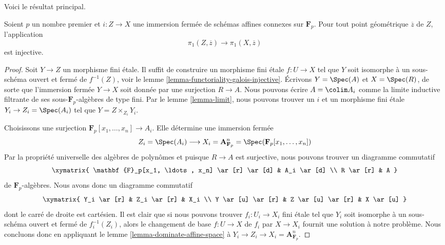 \noindent
Voici le résultat principal.

\begin{proposition}
\label{proposition-injective}
Soient $p$ un nombre premier et $i : Z \to X$ une immersion fermée
de schémas affines connexes sur $\mathbf{F}_p$. Pour tout point géométrique
$\overline{z}$ de $Z$, l'application
$$
\pi_1(Z, \overline{z}) \to \pi_1(X, \overline{z})
$$
est injective.
\end{proposition}

\begin{proof}
Soit $Y \to Z$ un morphisme fini \'etale. Il suffit de construire
un morphisme fini \'etale $f : U \to X$ tel que $Y$ soit isomorphe à
un sous-schéma ouvert et fermé de $f^{-1}(Z)$, voir
le lemme \ref{lemma-functoriality-galois-injective}.
Écrivons $Y = \Spec(A)$ et $X = \Spec(R)$, de sorte que l'immersion fermée
$Y \to X$ soit donnée par une surjection $R \to A$. Nous pouvons écrire
$A = \colim A_i$ comme la limite inductive filtrante de ses sous-$\mathbf{F}_p$-algèbres
de type fini. Par le lemme \ref{lemma-limit},
nous pouvons trouver un $i$ et un morphisme fini \'etale $Y_i \to Z_i = \Spec(A_i)$
tel que $Y = Z \times_{Z_i} Y_i$.

\medskip\noindent
Choisissons une surjection $\mathbf{F}_p[x_1, \ldots, x_n] \to A_i$.
Elle détermine une immersion fermée
$$
Z_i = \Spec(A_i)
\longrightarrow
X_i = \mathbf{A}^n_{\mathbf{F}_p} = \Spec(\mathbf{F}_p[x_1, \ldots, x_n])
$$
Par la propriété universelle des algèbres de polynômes et puisque
$R \to A$ est surjective, nous pouvons trouver un diagramme commutatif
$$
\xymatrix{
\mathbf{F}_p[x_1, \ldots, x_n] \ar[r] \ar[d] &
A_i \ar[d] \\
R \ar[r] &
A
}
$$
de $\mathbf{F}_p$-algèbres. Nous avons donc un diagramme commutatif
$$
\xymatrix{
Y_i \ar[r] &
Z_i \ar[r] &
X_i \\
Y \ar[u] \ar[r] &
Z \ar[u] \ar[r] &
X \ar[u]
}
$$
dont le carré de droite est cartésien. Il est clair que si nous pouvons
trouver $f_i : U_i \to X_i$ fini \'etale tel que $Y_i$ soit
isomorphe à un sous-schéma ouvert et fermé de $f_i^{-1}(Z_i)$,
alors le changement de base $f : U \to X$ de $f_i$ par $X \to X_i$
fournit une solution à notre problème. Nous concluons donc en appliquant
le lemme \ref{lemma-dominate-affine-space} à
$Y_i \to Z_i \to X_i = \mathbf{A}^n_{\mathbf{F}_p}$.
\end{proof}

















